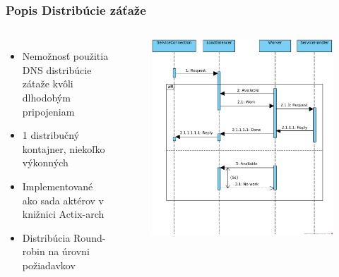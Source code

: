 \documentclass[10pt,xcolor=pdflatex]{beamer}
\begin{document}
\begin{frame}[noframenumbering]
    \frametitle{Popis Distribúcie záťaže}
    \begin{columns}
        \begin{itemize}
            \item Nemožnosť použitia DNS distribúcie zátaže kvôli dlhodobým pripojeniam
            \item 1 distribučný kontajner, niekoľko výkonných
            \item Implementované ako sada aktérov v knižnici Actix-arch
            \item Distribúcia Round-robin na úrovni požiadavkov
        \end{itemize}
        \begin{figure}
            \includegraphics[height=0.65\textheight]{img/load_balancer.png}
        \end{figure}
    \end{columns}
\end{frame}
\end{document}
